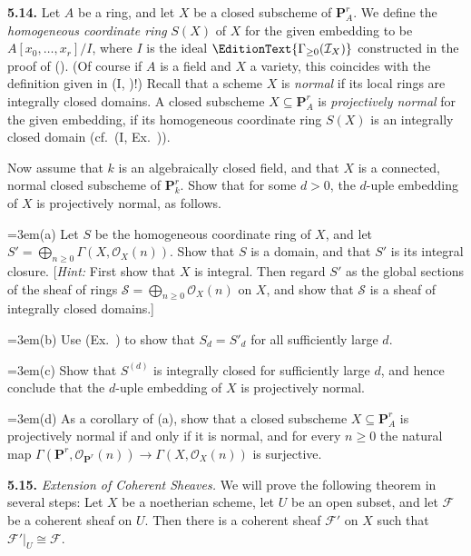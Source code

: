 {\smallskip
\noindent\hypertarget{ex-II-5.14}{}\textbf{5.14.} Let $A$ be a ring, and let $X$ be a closed subscheme of $\mathbf P_A^r$. We define the \emph{homogeneous coordinate ring} $S(X)$ of $X$ for the given embedding to be $A[x_0,\ldots,x_r]/I$, where $I$ is the ideal $\EditionText{\Gamma_{\geq0}(\mathcal I_X)}$ constructed in the proof of (). (Of course if $A$ is a field and $X$ a variety, this coincides with the definition given in (I, )!) Recall that a scheme $X$ is \emph{normal} if its local rings are integrally closed domains. A closed subscheme $X\subseteq\mathbf P_A^r$ is \emph{projectively normal} for the given embedding, if its homogeneous coordinate ring $S(X)$ is an integrally closed domain (cf.\ (I, Ex.~)).

Now assume that $k$ is an algebraically closed field, and that $X$ is a connected, normal closed subscheme of $\mathbf P_k^r$. Show that for some $d>0$, the $d$-uple embedding of $X$ is projectively normal, as follows.

\noindent\hangindent=3em\hspace*{1.7em}(a) Let $S$ be the homogeneous coordinate ring of $X$, and let $S'=\bigoplus_{n\ge0}\Gamma(X,\mathcal O_X(n))$. Show that $S$ is a domain, and that $S'$ is its integral closure. [\emph{Hint:} First show that $X$ is integral. Then regard $S'$ as the global sections of the sheaf of rings $\mathcal S=\bigoplus_{n\ge0}\mathcal O_X(n)$ on $X$, and show that $\mathcal S$ is a sheaf of integrally closed domains.]

\noindent\hangindent=3em\hspace*{1.7em}(b) Use (Ex.~) to show that $S_d=S'_d$ for all sufficiently large $d$.

\noindent\hangindent=3em\hspace*{1.7em}(c) Show that $S^{(d)}$ is integrally closed for sufficiently large $d$, and hence conclude that the $d$-uple embedding of $X$ is projectively normal.

\noindent\hangindent=3em\hspace*{1.7em}(d) As a corollary of (a), show that a closed subscheme $X\subseteq\mathbf P_A^r$ is projectively normal if and only if it is normal, and for every $n\ge0$ the natural map $\Gamma(\mathbf P^r,\mathcal O_{\mathbf P^r}(n))\to\Gamma(X,\mathcal O_X(n))$ is surjective.

\smallskip
\noindent\hypertarget{ex-II-5.15}{}\textbf{5.15.} \emph{Extension of Coherent Sheaves.} We will prove the following theorem in several steps: Let $X$ be a noetherian scheme, let $U$ be an open subset, and let $\mathcal F$ be a coherent sheaf on $U$. Then there is a coherent sheaf $\mathcal F'$ on $X$ such that $\mathcal F'|_U\cong \mathcal F$.

}
